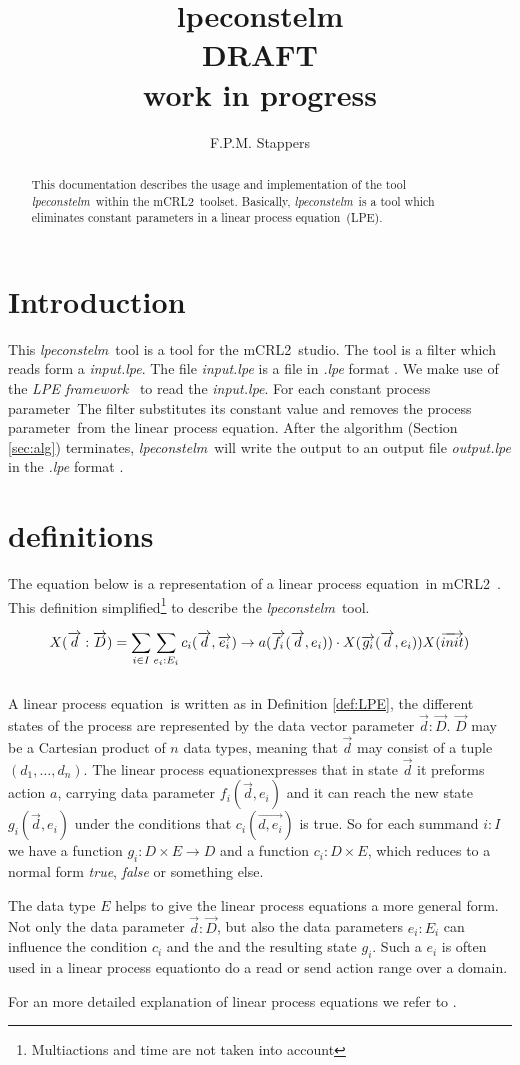 \documentclass[a4paper,10pt]{article}
\title{lpeconstelm \\ DRAFT \\ work in progress}
\author{F.P.M. Stappers}
\newcommand{\lpe}{linear process equation}
\newcommand{\tool}{\textit{lpeconstelm}}
\newcommand{\ovr}{\overrightarrow}
\newcommand{\mcrl}{mCRL2}
\newcommand{\framework}{\textit{LPE framework} \cite{LPEframework}}
\newcommand{\pp}{process parameter}
\newcommand{\ti}{\textit}
\begin{document}
\maketitle

\begin{abstract}
This documentation describes the usage and implementation of the tool \tool\ within the \mcrl\ toolset.
Basically, \tool\ is a tool which eliminates constant parameters in a \lpe\ (LPE).
\end{abstract}

\tableofcontents

\section{Introduction}
This \tool\ tool is a tool for the \mcrl\ studio. The tool is a
filter which reads form a \ti{input.lpe}. The file \ti{input.lpe} is
a file in \ti{.lpe} format \cite{LPEformat}. We make use of the
\framework\ to read the \ti{input.lpe}. For
each constant \pp\ The filter substitutes its constant value and removes the \pp\ from the
\lpe . After the algorithm (Section \ref{sec:alg}) terminates, \tool\
will write the output to an output file \ti{output.lpe} in the \ti{.lpe} format \cite{LPEformat}.

\section{definitions} \label{sec:def}

The equation below is a representation of a \lpe\ in \mcrl\ . This definition simplified\footnote{Multiactions and time are not taken into account} to describe the \tool\ tool.
\begin{defn}[\lpe]\label{def:LPE}
\begin{displaymath}
X (\ovr{d}:\ovr{D}) = \sum_{i \in I} \sum_{e_i:E_i} c_i ( \ovr{d}, \ovr{e_i} ) \rightarrow a(\ovr{f_i}(\ovr{d},e_i)) \cdot X(\ovr{g_i}(\ovr{d},e_i)) $$
$$ X(\ovr{init})
\end{displaymath}\\
A \lpe\ is written as in Definition \ref{def:LPE}, the different states of the process are represented by the data vector parameter $\ovr{d}:\ovr{D}$. $\ovr{D}$ may be a Cartesian product of $n$ data types, meaning that $\ovr{d}$ may consist of a tuple $(d_1, \ldots, d_n)$. The \lpe expresses that in state $\ovr{d}$ it preforms action $a$, carrying data parameter $f_i(\ovr{d},e_i)$ and it can reach the new state $g_i(\ovr{d},e_i)$ under the conditions that $c_i(\ovr{d,e_i})$ is true. So for each summand $i:I$ we have a function $g_i: D \times E \rightarrow D$ and a function $c_i: D \times E $, which reduces to a normal form \ti{true}, \ti{false} or something else. 

The data type $E$ helps to give the \lpe s a more general form. Not only the data parameter $\ovr{d}:\ovr{D}$, but also the data parameters $e_i: E_i$ can influence the condition $c_i$ and the and the resulting state $g_i$. Such a $e_i$ is often used in a \lpe to do a read or send action range over a domain. 

For an more detailed explanation of \lpe s  we refer to \cite{LPE_info}.
\end{defn}
\end{document}
